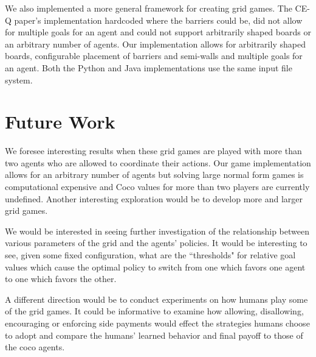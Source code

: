 \hspace{5mm}We also implemented a more general framework for creating grid games. The CE-Q paper's implementation hardcoded where the barriers could be, did not allow for multiple goals for an agent and could not support arbitrarily shaped boards or an arbitrary number of agents. Our implementation allows for arbitrarily shaped boards, configurable placement of barriers and semi-walls and multiple goals for an agent. Both the Python and Java implementations use the same input file system.


\section{Future Work}
\hspace{5mm} We foresee interesting results when these grid games are played with more than two agents who are allowed to coordinate their actions. Our game implementation allows for an arbitrary number of agents but solving large normal form games is computational expensive and Coco values for more than two players are currently undefined. Another interesting exploration would be to develop more and larger grid games.

We would be interested in seeing further investigation of the relationship between various parameters of the grid and the agents' policies. It would be interesting to see, given some fixed configuration, what are the ``thresholds" for relative goal values which cause the optimal policy to switch from one which favors one agent to one which favors the other.

A different direction would be to conduct experiments on how humans play some of the grid games. It could be informative to examine how allowing, disallowing, encouraging or enforcing side payments would effect the strategies humans choose to adopt and compare the humans' learned behavior and final payoff to those of the coco agents.



